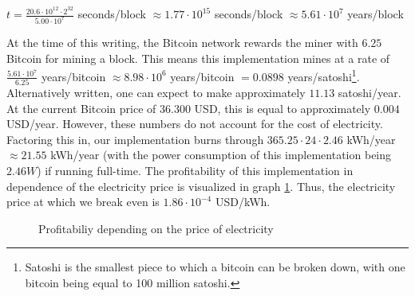 $t = \frac{20.6 \cdot {10^{12}} \cdot {2^{32}}} {5.00 \cdot {10^{7}}}$ seconds/block $\approx 1.77 \cdot {10^{15}}$ seconds/block $\approx 5.61 \cdot {10^{7}}$ years/block

At the time of this writing, the Bitcoin network rewards the miner with $6.25$ Bitcoin for mining a block. This means this implementation mines at a rate of $\frac{5.61 \cdot {10^{7}}}{6.25}$ years/bitcoin $\approx 8.98 \cdot {10^{6}}$ years/bitcoin $= 0.0898$ years/satoshi\footnote{Satoshi is the smallest piece to which a bitcoin can be broken down, with one bitcoin being equal to 100 million satoshi.}. Alternatively written, one can expect to make approximately $11.13$ satoshi/year. At the current Bitcoin price of $36.300$ USD, this is equal to approximately $0.004$ USD/year. However, these numbers do not account for the cost of electricity. Factoring this in, our implementation burns through $365.25 \cdot 24 \cdot 2.46 $ kWh/year $\approx 21.55$ kWh/year (with the power consumption of this implementation being $2.46 W$) if running full-time. The profitability of this implementation in dependence of the electricity price is visualized in graph \ref{perf:profitability}. Thus, the electricity price at which we break even is $1.86 \cdot {10^{-4}}$ USD/kWh.

\begin{figure}
\centering

\caption{Profitabiliy depending on the price of electricity\label{perf:profitability}}
\end{figure}
